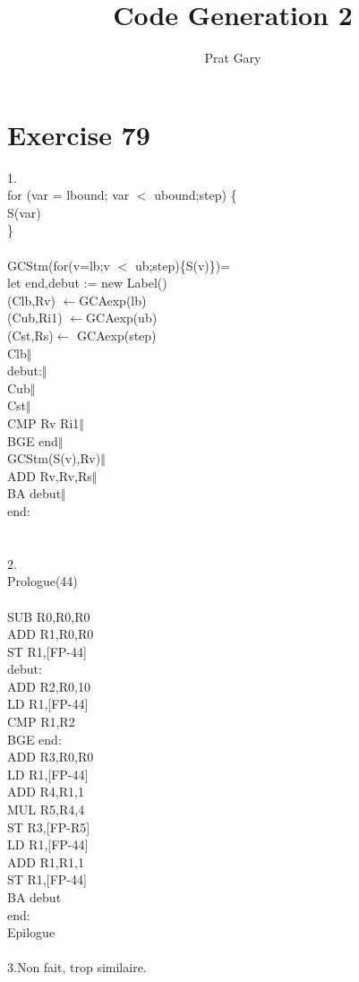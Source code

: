 \documentclass[10pt,a4paper]{article}
\author{Prat Gary}
\title{Code Generation 2}
\begin{document}
\maketitle
\section{Exercise 79}

1.\\
for (var = lbound; var $<$ ubound;step) \{\\ 
\tabto{0.5cm}S(var)\\
\}
\\\\
GCStm(for(v=lb;v $<$ ub;step)\{S(v)\})=\\
let end,debut := new Label()\\
(Clb,Rv) $\leftarrow$GCAexp(lb)\\
(Cub,Ri1) $\leftarrow$GCAexp(ub)\\
(Cst,Rs)$\leftarrow$ GCAexp(step)\\
Clb$\Vert$\\
debut:$\Vert$\\
Cub$\Vert$\\
Cst$\Vert$\\
CMP Rv Ri1$\Vert$\\
BGE end$\Vert$\\
GCStm(S(v),Rv)$\Vert$\\
ADD Rv,Rv,Rs$\Vert$\\
BA debut$\Vert$\\
end:\\\\\\
2.\\
Prologue(44)\\\\
SUB R0,R0,R0\\
ADD R1,R0,R0\\
ST R1,[FP-44]\\
debut:\\
ADD R2,R0,10\\
LD R1,[FP-44]\\
CMP R1,R2\\
BGE end:\\
ADD R3,R0,R0\\
LD R1,[FP-44]\\
ADD R4,R1,1\\
MUL R5,R4,4\\
ST R3,[FP-R5]\\
LD R1,[FP-44]\\
ADD R1,R1,1\\
ST R1,[FP-44]\\
BA debut\\
end:\\
Epilogue\\\\
3.Non fait, trop similaire.\\
\\
\end{document}
